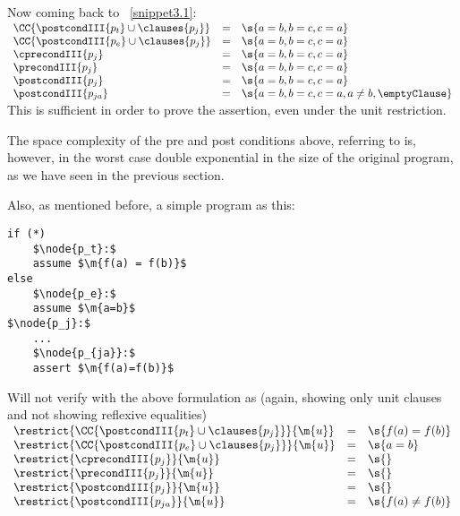 Now coming back to ~\ref{snippet3.1}:\\
$
\begin{array}{lllll}
\CC{\postcondIII{p_t} \cup \clauses{p_j}}  & = & \s{a=b,b=c,c=a} \\
\CC{\postcondIII{p_e} \cup \clauses{p_j}}  & = & \s{a=b,b=c,c=a} \\
\cprecondIII{p_j}                          & = & \s{a=b,b=c,c=a} \\
\precondIII{p_j}                           & = & \s{a=b,b=c,c=a} \\
\postcondIII{p_j}                          & = & \s{a=b,b=c,c=a} \\
\postcondIII{p_{ja}}                       & = & \s{a=b,b=c,c=a,a \neq b,\emptyClause} \\
\end{array}
$\\
This is sufficient in order to prove the assertion, even under the unit restriction.

The space complexity of the pre and post conditions above, referring to  is, however, in the worst case double exponential in the size of the original program, as we have seen in the previous section.

Also, as mentioned before, a simple program as this:
\begin{lstlisting}[caption={join congruence closure},label=snippet3.3]
if (*)
	$\node{p_t}:$
	assume $\m{f(a) = f(b)}$
else	
	$\node{p_e}:$
	assume $\m{a=b}$
$\node{p_j}:$
	...
	$\node{p_{ja}}:$
	assert $\m{f(a)=f(b)}$
\end{lstlisting}

Will not verify with the above formulation as (again, showing only unit clauses and not showing reflexive equalities)\\
$
\begin{array}{lllll}
\restrict{\CC{\postcondIII{p_t} \cup \clauses{p_j}}}{\m{u}}  & = & \s{f(a)=f(b)} \\
\restrict{\CC{\postcondIII{p_e} \cup \clauses{p_j}}}{\m{u}}  & = & \s{a=b} \\
\restrict{\cprecondIII{p_j}}{\m{u}}                          & = & \s{} \\
\restrict{\precondIII{p_j}}{\m{u}}                           & = & \s{} \\
\restrict{\postcondIII{p_j}}{\m{u}}                          & = & \s{} \\
\restrict{\postcondIII{p_{ja}}}{\m{u}}                       & = & \s{f(a) \neq f(b)} \\
\end{array}
$

